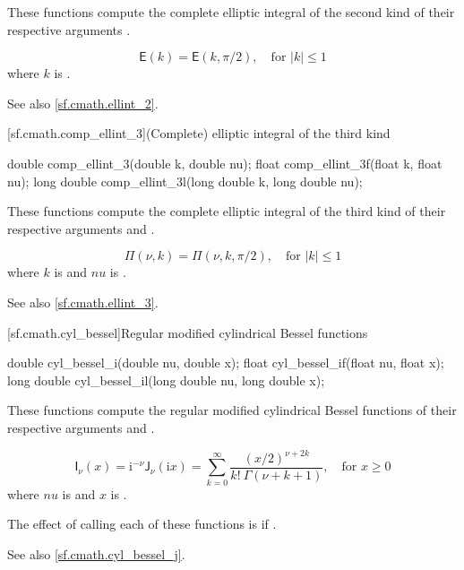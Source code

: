 \begin{itemdescr}

\pnum\effects
These functions compute
the complete elliptic integral of the second kind
of their respective arguments
.

\pnum\returns
\[%
  \mathsf{E}(k) =
  \mathsf{E}(k, \pi / 2),
\quad \mbox{for $|k| \le 1$}
\]
where
$k$ is .

\pnum See also \ref{sf.cmath.ellint_2}.
\end{itemdescr}

[sf.cmath.comp_ellint_3]{(Complete) elliptic integral of the third kind}%
%
%
%
%
%
\begin{itemdecl}
double       comp_ellint_3(double k, double nu);
float        comp_ellint_3f(float k, float nu);
long double  comp_ellint_3l(long double k, long double nu);
\end{itemdecl}

\begin{itemdescr}

\pnum\effects
These functions compute
the complete elliptic integral of the third kind
of their respective arguments
 and .

\pnum\returns
\[%
  \mathsf{\Pi}(\nu, k) = \mathsf{\Pi}(\nu, k, \pi / 2),
		\quad \mbox{for $|k| \le 1$}
\]
where
$k$ is  and
$nu$ is .

\pnum See also \ref{sf.cmath.ellint_3}.
\end{itemdescr}

[sf.cmath.cyl_bessel]{Regular modified cylindrical Bessel functions}%
%
%
%
%
%
\begin{itemdecl}
double       cyl_bessel_i(double nu, double x);
float        cyl_bessel_if(float nu, float x);
long double  cyl_bessel_il(long double nu, long double x);
\end{itemdecl}

\begin{itemdescr}

\pnum\effects
These functions compute
the regular modified cylindrical Bessel functions
of their respective arguments
 and .

\pnum\returns
\[%
  \mathsf{I}_\nu(x) =
  \mathrm{i}^{-\nu} \mathsf{J}_\nu(\mathrm{i}x)
  =
  \sum_{k=0}^\infty \frac{(x/2)^{\nu+2k}}
			 {k! \: \Gamma(\nu+k+1)},
	   \quad \mbox{for $x \ge 0$}
\]
where
$nu$ is  and
$x$ is .

\pnum\remark
The effect of calling each of these functions
is 
if .

\pnum See also \ref{sf.cmath.cyl_bessel_j}.
\end{itemdescr}

